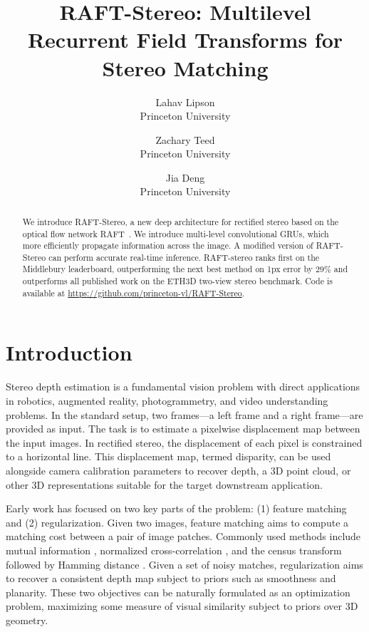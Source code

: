 \documentclass[10pt,twocolumn,letterpaper]{article}
\begin{document}
\title{RAFT-Stereo: Multilevel Recurrent Field Transforms for Stereo Matching}

\author{Lahav Lipson\\
Princeton University\\

\and
Zachary Teed\\
Princeton University\\

\and
Jia Deng\\
Princeton University\\
}

\maketitle


\begin{abstract}
   We introduce RAFT-Stereo, a new deep architecture for rectified stereo based on the optical flow network RAFT~\cite{teed2020raft}. We introduce multi-level convolutional GRUs, which more efficiently propagate information across the image. A modified version of RAFT-Stereo can perform accurate real-time inference. RAFT-stereo ranks first on the Middlebury leaderboard, outperforming the next best method on 1px error by $29\%$ and outperforms all published work on the ETH3D two-view stereo benchmark. Code is available at \url{https://github.com/princeton-vl/RAFT-Stereo}.
\end{abstract}

\section{Introduction}
Stereo depth estimation is a fundamental vision problem with direct applications in robotics, augmented reality, photogrammetry, and video understanding problems. In the standard setup, two frames---a left frame and a right frame---are provided as input. The task is to estimate a pixelwise displacement map between the input images. In rectified stereo, the displacement of each pixel is constrained to a horizontal line. This displacement map, termed disparity, can be used alongside camera calibration parameters to recover depth, a 3D point cloud, or other 3D representations suitable for the target downstream application.


Early work has focused on two key parts of the problem: (1) feature matching and (2) regularization. Given two images, feature matching aims to compute a matching cost between a pair of image patches. Commonly used methods include mutual information \cite{hirschmuller2007stereo}, normalized cross-correlation \cite{heo2010robust}, and the census transform followed by Hamming distance \cite{fife2012improved}.  Given a set of noisy matches, regularization aims to recover a consistent depth map subject to priors such as smoothness and planarity. These two objectives can be naturally formulated as an optimization problem, maximizing some measure of visual similarity subject to priors over 3D geometry.
\end{document}
